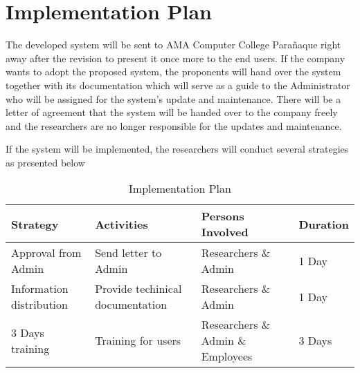 \section{Implementation Plan}

The developed system will be sent to AMA Computer College Parañaque right away after the revision to present it once more to the end users.
If the company wants to adopt the proposed system, the proponents will hand over the system together with its documentation which will serve as a guide to the Administrator who will be assigned for the system's update and maintenance.
There will be a letter of agreement that the system will be handed over to the company freely and the researchers are no longer responsible for the updates and maintenance.

If the system will be implemented, the researchers will conduct several strategies as presented below

\vspace{1cm}

\begin{table}[h!]
   \begin{center}
      \begin{tabular}{|m{10em}|m{8em}|m{10em}|m{4em}|}
         \hline
         \textbf{Strategy}        & \textbf{Activities}              & \textbf{Persons Involved}         & \textbf{Duration} \\
         \hline
         Approval from Admin      & Send letter to Admin             & Researchers \& Admin              & 1 Day             \\
         \hline
         Information distribution & Provide techinical documentation & Researchers \& Admin              & 1 Day             \\
         \hline
         3 Days training          & Training for users               & Researchers \& Admin \& Employees & 3 Days            \\
         \hline
      \end{tabular}
   \end{center}

   \caption{Implementation Plan}
\end{table}
